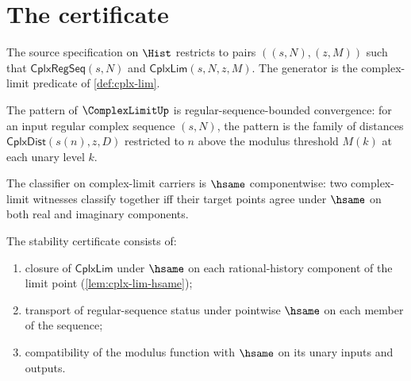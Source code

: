 \section{The certificate}

\begin{definition}
\label{def:cplx-lim-source-specification}
The source specification on \(\Hist\) restricts to pairs \(((s, N), (z, M))\) such that \(\mathsf{CplxRegSeq}(s, N)\) and \(\mathsf{CplxLim}(s, N, z, M)\). The generator is the complex-limit predicate of \autoref{def:cplx-lim}.
\end{definition}

\begin{definition}
\label{def:cplx-lim-pattern-specification}
The pattern of \(\ComplexLimitUp\) is regular-sequence-bounded convergence: for an input regular complex sequence \((s, N)\), the pattern is the family of distances \(\mathsf{CplxDist}(s(n), z, D)\) restricted to \(n\) above the modulus threshold \(M(k)\) at each unary level \(k\).
\end{definition}

\begin{definition}
\label{def:cplx-lim-classifier-specification}
The classifier on complex-limit carriers is \(\hsame\) componentwise: two complex-limit witnesses classify together iff their target points agree under \(\hsame\) on both real and imaginary components.
\end{definition}

\begin{definition}
\label{def:cplx-lim-stability-certificate}
The stability certificate consists of:
\begin{enumerate}
  \item closure of \(\mathsf{CplxLim}\) under \(\hsame\) on each rational-history component of the limit point (\autoref{lem:cplx-lim-hsame});
  \item transport of regular-sequence status under pointwise \(\hsame\) on each member of the sequence;
  \item compatibility of the modulus function with \(\hsame\) on its unary inputs and outputs.
\end{enumerate}
\end{definition}

